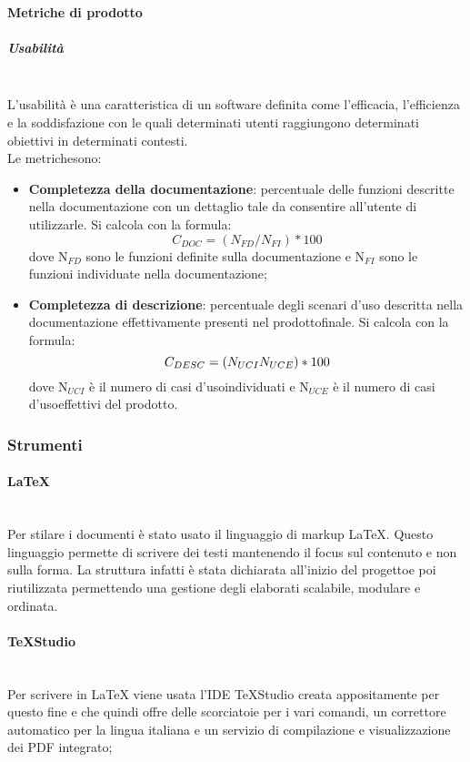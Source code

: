                 \paragraph{Metriche di prodotto}
                \subparagraph{Usabilità} \mbox{}\\[1mm]
	            L'usabilità è una caratteristica di un software definita come l'efficacia, l'efficienza e la soddisfazione con le quali determinati utenti raggiungono determinati obiettivi in determinati contesti.\\
	            Le metriche\glosp sono:
	            \begin{itemize}
		        \item \textbf{Completezza della documentazione}: percentuale delle funzioni descritte nella documentazione con un dettaglio tale da consentire all'utente di utilizzarle. Si calcola con la formula:
		        \[C_{DOC}=(N_{FD}/N_{FI})*100\]
		        dove N$_{FD}$ sono le funzioni definite sulla documentazione e N$_{FI}$ sono le funzioni individuate nella documentazione;
		        \item \textbf{Completezza di descrizione}: percentuale degli scenari d’uso descritta nella documentazione effettivamente presenti nel prodotto\glosp finale. Si calcola con la formula:
		        \[C_{DESC}=(N_{UCI}\\N_{UCE})*100\]
		        dove N$_{UCI}$ è il numero di casi d'uso\glosp individuati e N$_{UCE}$ è il numero di casi d'uso\glosp effettivi del prodotto\glo.
	            \end{itemize}
            \subsubsection{Strumenti}
                \paragraph{\LaTeX}\mbox{}\\ [1mm]
                    Per stilare i documenti è stato usato il linguaggio di markup \LaTeX \xspace. Questo linguaggio permette di scrivere dei testi mantenendo il focus
                    sul contenuto e non sulla forma. La struttura infatti è stata dichiarata all'inizio del progetto\glosp e poi riutilizzata permettendo una gestione degli elaborati scalabile, modulare e ordinata.
                \paragraph{TeXStudio}\mbox{}\\ [1mm]
                    Per scrivere in \LaTeX \xspace viene usata l'IDE TeXStudio creata appositamente per questo fine e che quindi offre delle scorciatoie
                    per i vari comandi, un correttore automatico per la lingua italiana e un servizio di compilazione e visualizzazione dei PDF integrato;
